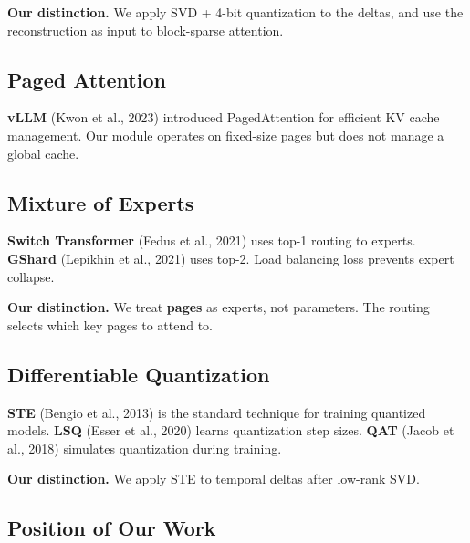 \textbf{Our distinction.} We apply SVD + 4-bit quantization to the deltas, and 
use the reconstruction as input to block-sparse attention.

\subsection{Paged Attention}

\textbf{vLLM} (Kwon et al., 2023) introduced PagedAttention for efficient KV cache 
management. Our module operates on fixed-size pages but does not manage a 
global cache.

\subsection{Mixture of Experts}

\textbf{Switch Transformer} (Fedus et al., 2021) uses top-1 routing to experts. 
\textbf{GShard} (Lepikhin et al., 2021) uses top-2. Load balancing loss prevents 
expert collapse.

\textbf{Our distinction.} We treat \textbf{pages} as experts, not parameters. The 
routing selects which key pages to attend to.

\subsection{Differentiable Quantization}

\textbf{STE} (Bengio et al., 2013) is the standard technique for training 
quantized models. \textbf{LSQ} (Esser et al., 2020) learns quantization step 
sizes. \textbf{QAT} (Jacob et al., 2018) simulates quantization during training.

\textbf{Our distinction.} We apply STE to temporal deltas after low-rank SVD.

\subsection{Position of Our Work}

